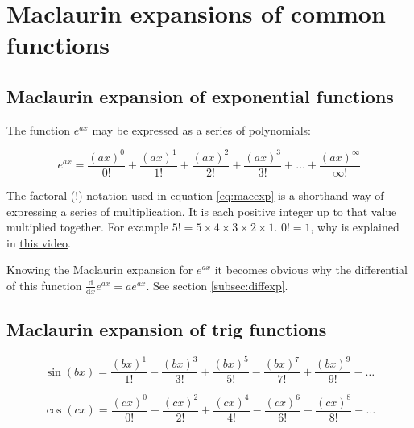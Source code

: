 \documentclass[
]{book}
\begin{document}
\hypertarget{sec:maclaurin}{%
\section{Maclaurin expansions of common functions}\label{sec:maclaurin}}

\hypertarget{subsec:macexp}{%
\subsection{Maclaurin expansion of exponential functions}\label{subsec:macexp}}

The function \(e^{ax}\) may be expressed as a series of polynomials:

\begin{equation}
e^{ax} = \frac{(ax)^0}{0!} + \frac{(ax)^1}{1!} + \frac{(ax)^2}{2!} + \frac{(ax)^3}{3!} + \dots + \frac{(ax)^\infty}{\infty!}
\label{eq:macexp}
\end{equation}

The factoral (\(!\)) notation used in equation \eqref{eq:macexp} is a shorthand way of expressing a series of multiplication. It is each positive integer up to that value multiplied together. For example \(5! = 5 \times 4 \times 3\times 2 \times 1\). \(0!=1\), why is explained in \href{https://www.youtube.com/watch?v=Mfk_L4Nx2ZI}{this video}.

Knowing the Maclaurin expansion for \(e^{ax}\) it becomes obvious why the differential of this function \(\frac{\textrm{d}}{\textrm{d}x}e^{ax}=ae^{ax}\). See section \ref{subsec:diffexp}.

\hypertarget{subsec:mactrig}{%
\subsection{Maclaurin expansion of trig functions}\label{subsec:mactrig}}

\begin{equation}
\sin(bx) = \frac{(bx)^1}{1!} - \frac{(bx)^3}{3!} + \frac{(bx)^5}{5!} - \frac{(bx)^7}{7!}  + \frac{(bx)^9}{9!} - \dots
\label{eq:macsin}
\end{equation}

\begin{equation}
\cos(cx) = \frac{(cx)^0}{0!} - \frac{(cx)^2}{2!} + \frac{(cx)^4}{4!} - \frac{(cx)^6}{6!}  + \frac{(cx)^8}{8!} - \dots
\label{eq:maccos}
\end{equation}

  
\end{document}
